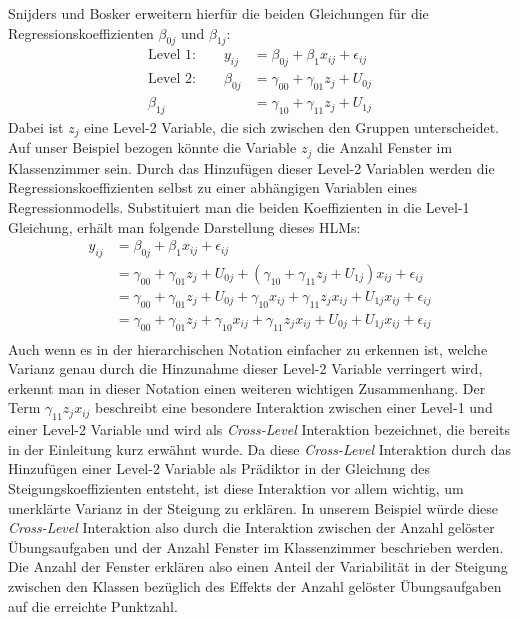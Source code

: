 \documentclass[12pt]{article}\usepackage[]{graphicx}\usepackage[]{color}
\begin{document}
Snijders und Bosker \citeyearpar{SnijdersTomA.B2012Ma:a} erweitern hierfür die beiden Gleichungen für die Regressionskoeffizienten $\beta_{0j}$ und $\beta_{1j}$:
\begin{equation} \label{eq:variance}
\begin{split}	
 \text{Level 1:}  \qquad y_{ij} & = \beta_{0j} + \beta_{1}x_{ij} + \epsilon_{ij}\\
 \text{Level 2:} \qquad \beta_{0j} & = \gamma_{00} + \gamma_{01}z_{j} + U_{0j}\\
 \beta_{1j} & = \gamma_{10} + \gamma_{11}z_{j} + U_{1j}
\end{split}	
\end{equation}
Dabei ist $z_{j}$ eine Level-2 Variable, die sich zwischen den Gruppen unterscheidet. Auf unser Beispiel bezogen könnte die Variable $z_{j}$ die Anzahl Fenster im Klassenzimmer sein. Durch das Hinzufügen dieser Level-2 Variablen werden die Regressionskoeffizienten selbst zu einer abhängigen Variablen eines Regressionmodells. Substituiert man die beiden Koeffizienten in die Level-1 Gleichung, erhält man folgende Darstellung dieses HLMs:
\begin{equation} \label{eq:flat_variance}
\begin{split}	
y_{ij} & = \beta_{0j} + \beta_{1}x_{ij} + \epsilon_{ij}\\
& = \gamma_{00} + \gamma_{01}z_{j} + U_{0j} + (\gamma_{10} + \gamma_{11}z_{j} + U_{1j})x_{ij} + \epsilon_{ij}\\
& = \gamma_{00} + \gamma_{01}z_{j} + U_{0j} + \gamma_{10}x_{ij} + \gamma_{11}z_{j}x_{ij} + U_{1j}x_{ij} + \epsilon_{ij}\\
& = \gamma_{00} + \gamma_{01}z_{j} + \gamma_{10}x_{ij} + \gamma_{11}z_{j}x_{ij} + U_{0j} + U_{1j}x_{ij} + \epsilon_{ij}\\
\end{split}	
\end{equation} 
Auch wenn es in der hierarchischen Notation einfacher zu erkennen ist, welche Varianz genau durch die Hinzunahme dieser Level-2 Variable verringert wird, erkennt man in dieser Notation einen weiteren wichtigen Zusammenhang. Der Term $\gamma_{11}z_{j}x_{ij}$ beschreibt eine besondere Interaktion zwischen einer Level-1 und einer Level-2 Variable und wird als \textit{Cross-Level} Interaktion bezeichnet, die bereits in der Einleitung kurz erwähnt wurde. Da diese \textit{Cross-Level} Interaktion durch das Hinzufügen einer Level-2 Variable als Prädiktor in der Gleichung des Steigungskoeffizienten entsteht, ist diese Interaktion vor allem wichtig, um unerklärte Varianz in der Steigung zu erklären. In unserem Beispiel würde diese \textit{Cross-Level} Interaktion also durch die Interaktion zwischen der Anzahl gelöster Übungsaufgaben und der Anzahl Fenster im Klassenzimmer beschrieben werden. Die Anzahl der Fenster erklären also einen Anteil der Variabilität in der Steigung zwischen den Klassen bezüglich des Effekts der Anzahl gelöster Übungsaufgaben auf die erreichte Punktzahl.
\end{document}
